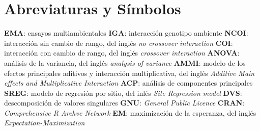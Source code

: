 

\chapter*{Abreviaturas y Símbolos}

\textbf{EMA}: ensayos multiambientales
\textbf{IGA}: interacción genotipo ambiente
\textbf{NCOI}: interacción sin cambio de rango, del inglés \emph{no crossover interaction}
\textbf{COI}:  interacción con cambio de rango, del inglés \emph{crossover interaction}
\textbf{ANOVA}: análisis de la variancia, del inglés \emph{analysis of variance}
\textbf{AMMI}: modelo de los efectos principales aditivos y interacción multiplicativa, del inglés \emph{Additive Main effects and Multiplicative Interaction}
\textbf{ACP}: análisis de componentes principales
\textbf{SREG}: modelo de regresión por sitio, del inlés \emph{Site Regression model}
\textbf{DVS}: descomposición de valores singulares
\textbf{GNU}: \emph{General Public Licence}
\textbf{CRAN}: \emph{Comprehensive R Archve Network}
\textbf{EM}: maximización de la esperanza, del inglés \emph{Expectation-Maximization}